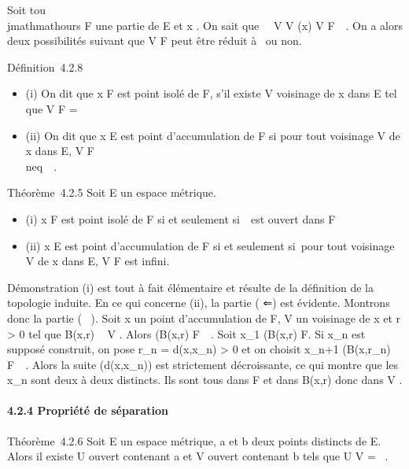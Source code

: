 \documentclass[]{article}
\begin{document}
Soit tou\\jmathmathours F une partie de E et x \in\overlineF. On
sait que \forall~~V \in V (x) V \bigcap
F\neq~\varnothing~. On a alors deux possibilités suivant que
V \bigcap F peut être réduit à \x\ ou non.

Définition~4.2.8

\begin{itemize}
\itemsep1pt\parskip0pt
\item
  (i) On dit que x \in F est point isolé de F, s'il existe V voisinage de
  x dans E tel que V \bigcap F = \x\
\item
  (ii) On dit que x \in E est point d'accumulation de F si pour tout
  voisinage V de x dans E, V \bigcap F
  \diagdown\x\\neq~\varnothing~.
\end{itemize}

Théorème~4.2.5 Soit E un espace métrique.

\begin{itemize}
\itemsep1pt\parskip0pt
\item
  (i) x \in F est point isolé de F si et seulement
  si~\x\ est ouvert dans F
\item
  (ii) x \in E est point d'accumulation de F si et seulement si~pour tout
  voisinage V de x dans E, V \bigcap F est infini.
\end{itemize}

Démonstration (i) est tout à fait élémentaire et résulte de la
définition de la topologie induite. En ce qui concerne (ii), la partie (
⇐) est évidente. Montrons donc la partie ( \rigtharrow~). Soit x un point
d'accumulation de F, V un voisinage de x et r \textgreater{} 0 tel que
B(x,r) \subset~ V . Alors (B(x,r) \diagdown\x\) \bigcap
F\neq~\varnothing~. Soit x_1 \in (B(x,r)
\diagdown\x\) \bigcap F. Si x_n est supposé
construit, on pose r_n = d(x,x_n) \textgreater{} 0 et
on choisit x_n+1 \in (B(x,r_n)
\diagdown\x\) \bigcap
F\neq~\varnothing~. Alors la suite (d(x,x_n)) est
strictement décroissante, ce qui montre que les x_n sont deux à
deux distincts. Ils sont tous dans F et dans B(x,r) donc dans V .

\paragraph{4.2.4 Propriété de séparation}

Théorème~4.2.6 Soit E un espace métrique, a et b deux points distincts
de E. Alors il existe U ouvert contenant a et V ouvert contenant b tels
que U \bigcap V = \varnothing~.
\end{document}
